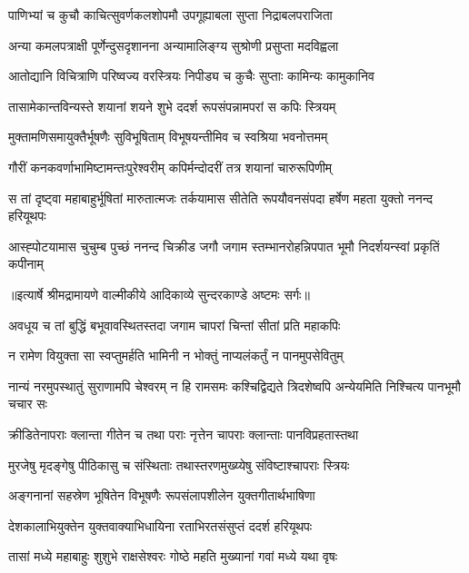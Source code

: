 \twolineshloka
{पाणिभ्यां च कुचौ काचित्सुवर्णकलशोपमौ}
{उपगूह्याबला सुप्ता निद्राबलपराजिता} %

\twolineshloka
{अन्या कमलपत्राक्षी पूर्णेन्दुसदृशानना}
{अन्यामालिङ्ग्य सुश्रोणी प्रसुप्ता मदविह्वला} %

\twolineshloka
{आतोद्यानि विचित्राणि परिष्वज्य वरस्त्रियः}
{निपीड्य च कुचैः सुप्ताः कामिन्यः कामुकानिव} %

\twolineshloka
{तासामेकान्तविन्यस्ते शयानां शयने शुभे}
{ददर्श रूपसंपन्नामपरां स कपिः स्त्रियम्} %

\twolineshloka
{मुक्तामणिसमायुक्तैर्भूषणैः सुविभूषिताम्}
{विभूषयन्तीमिव च स्वश्रिया भवनोत्तमम्} %

\twolineshloka
{गौरीं कनकवर्णाभामिष्टामन्तःपुरेश्वरीम्}
{कपिर्मन्दोदरीं तत्र शयानां चारुरूपिणीम्} %

\threelineshloka
{स तां दृष्ट्वा महाबाहुर्भूषितां मारुतात्मजः}
{तर्कयामास सीतेति रूपयौवनसंपदा}
{हर्षेण महता युक्तो ननन्द हरियूथपः} %

\fourlineindentedshloka
{आस्ह्पोटयामास चुचुम्ब पुच्छं}
{ ननन्द चिक्रीड जगौ जगाम}
{स्तम्भानरोहन्निपपात भूमौ}
{ निदर्शयन्स्वां प्रकृतिं कपीनाम्} %


{॥इत्यार्षे श्रीमद्रामायणे वाल्मीकीये आदिकाव्ये सुन्दरकाण्डे अष्टमः सर्गः॥}


\twolineshloka
{अवधूय च तां बुद्धिं बभूवावस्थितस्तदा}
{जगाम चापरां चिन्तां सीतां प्रति महाकपिः} %

\twolineshloka
{न रामेण वियुक्ता सा स्वप्तुमर्हति भामिनी}
{न भोक्तुं नाप्यलंकर्तुं न पानमुपसेवितुम्} %

\threelineshloka
{नान्यं नरमुपस्थातुं सुराणामपि चेश्वरम्}
{न हि रामसमः कश्चिद्विद्यते त्रिदशेष्वपि}
{अन्येयमिति निश्चित्य पानभूमौ चचार सः} %

\twolineshloka
{क्रीडितेनापराः क्लान्ता गीतेन च तथा पराः}
{नृत्तेन चापराः क्लान्ताः पानविप्रहतास्तथा} %

\twolineshloka
{मुरजेषु मृदङ्गेषु पीठिकासु च संस्थिताः}
{तथास्तरणमुख्य्येषु संविष्टाश्चापराः स्त्रियः} %

\twolineshloka
{अङ्गनानां सहस्रेण भूषितेन विभूषणैः}
{रूपसंलापशीलेन युक्तगीतार्थभाषिणा} %

\twolineshloka
{देशकालाभियुक्तेन युक्तवाक्याभिधायिना}
{रताभिरतसंसुप्तं ददर्श हरियूथपः} %

\twolineshloka
{तासां मध्ये महाबाहुः शुशुभे राक्षसेश्वरः}
{गोष्ठे महति मुख्यानां गवां मध्ये यथा वृषः} %

